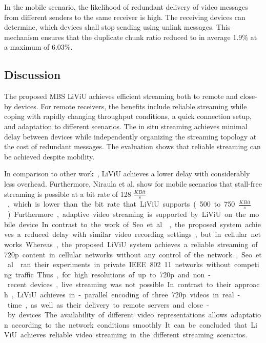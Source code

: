 In the mobile scenario, the likelihood of redundant delivery of video messages from different senders to the same receiver is high.
The receiving devices can determine, which devices shall stop sending using unlink messages.
This mechanism ensures that the duplicate chunk ratio reduced to in average 1.9\% at a maximum of 6.03\%.
\subsection{Discussion}
The proposed \ac{MBS} \ac{LiViU} achieves efficient streaming both to remote and close-by devices.
For remote receivers, the benefits include reliable streaming while coping with rapidly changing throughput conditions, a quick connection setup, and adaptation to different scenarios. The in situ streaming achieves minimal delay between devices while independently organizing the streaming topology at the cost of redundant messages.
The evaluation shows that reliable streaming can be achieved despite mobility.

In comparison to other work~\cite{Dezfuli2013,Niraula2009}, \ac{LiViU} achieves a lower delay with considerably less overhead.
Furthermore, Niraula et al. show for mobile scenarios that stall-free streaming is possible at a bit rate of 128 \unit{$\frac{KBit}{s}$}, which is lower than the bit rate that \ac{LiViU} supports (500 to 750 \unit{$\frac{KBit}{s}$}).
Furthermore, adaptive video streaming is supported by \ac{LiViU} on the mobile device.
In contrast to the work of Seo et al.~\cite{Seo2012}, the proposed system achieves a reduced delay with similar video recording settings, but in cellular networks.
Whereas, the proposed \ac{LiViU} system achieves a reliable streaming of \ac{720p} content in cellular networks without any control of the network, Seo. et al.~\cite{Seo2012} ran their experiments in private \ac{IEEE} 802.11 networks without competing traffic.
Thus, for high resolutions of up to \ac{720p} and non-recent devices, live streaming was not possible.
In contrast to their approach, \ac{LiViU} achieves in-parallel encoding of three \ac{720p} videos in real-time, as well as their delivery to remote servers and close-by devices.
The availability of different video representations allows adaptation according to the network conditions smoothly.
It can be concluded that \ac{LiViU} achieves reliable video streaming in the different streaming scenarios.